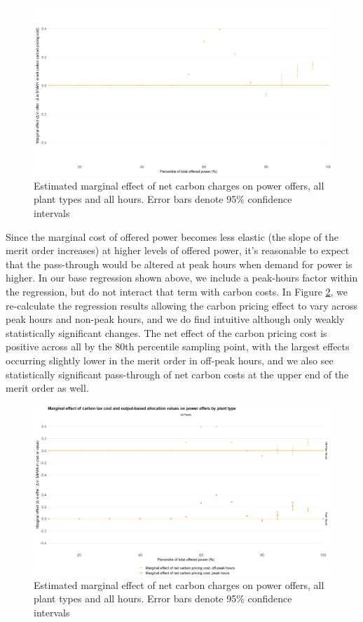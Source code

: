 \documentclass[12pt]{article}
\begin{document}
\begin{figure}[!htb]
    \centering
     \includegraphics[width=.9\textwidth]{../images/all_plants_net.png}
    \caption{Estimated marginal effect of net carbon charges on power offers, all plant types and all hours. Error bars denote 95\% confidence intervals}
    \label{fig:net_all}
\end{figure}


Since the marginal cost of offered power becomes less elastic (the slope of the merit order increases) at higher levels of offered power, it's reasonable to expect that the pass-through would be altered at peak hours when demand for power is higher. In our base regression shown above, we include a peak-hours factor within the regression, but do not interact that term with carbon costs. In Figure \ref{fig:net_peak}, we re-calculate the regression results allowing the carbon pricing effect to vary across peak hours and non-peak hours, and we do find intuitive although only weakly statistically significant changes. The net effect of the carbon pricing cost is positive across all by the 80th percentile sampling point, with the largest effects occurring slightly lower in the merit order in off-peak hours, and we also see statistically significant pass-through of net carbon costs at the upper end of the merit order as well. 

\begin{figure}[!htb]
    \centering
     \includegraphics[width=.9\textwidth]{../images/all_plants_net_peak.png}
    \caption{Estimated marginal effect of net carbon charges on power offers, all plant types and all hours. Error bars denote 95\% confidence intervals}
    \label{fig:net_peak}
\end{figure}
\end{document}
